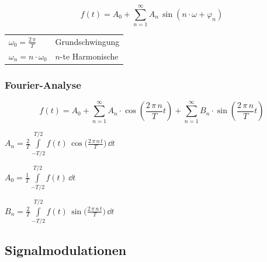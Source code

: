 \begin{minipage}[c]{0.48\columnwidth}
    $$ \boxed{ f(t) = A_0 + \sum\limits_{n=1}^{\infty}  A_n \, \sin(n \cdot \omega + \varphi_n) } $$
\end{minipage}
\hfill
\begin{minipage}[c]{0.48\columnwidth}
    \renewcommand{\arraystretch}{1.3}
    \begin{tabular}{ll}
        $\omega_0 = \frac{2 \, \pi}{T}$     & Grundschwingung   \\
        $\omega_n = n \cdot \omega_0$       & $n$-te Harmonische
    \end{tabular}
    \renewcommand{\arraystretch}{1}
\end{minipage}





\subsubsection{Fourier-Analyse}

\vspace{-0.2cm}

$$ \boxed{ f(t) = A_0 +  \sum\limits_{n=1}^{\infty}  A_n \cdot \cos  \left(\frac{ 2 \, \pi \, n}{T} t \right) + \sum\limits_{n=1}^{\infty}  B_n \cdot \sin \left( \frac{ 2 \, \pi \, n}{T} t \right)  } $$


\begin{minipage}{0.48\columnwidth}
    \centering
    $ A_n = \frac{2}{T} \int\limits_{-T/2}^{T/2} f(t) \, \cos \Big(\frac{ 2 \, \pi \, n \, t}{T}  \Big)  \, \dd t $
\end{minipage}
\hfill
\begin{minipage}{0.48\columnwidth}
    \centering
    $A_0 = \frac{1}{T} \int\limits_{-T/2}^{T/2} f(t) \, \dd t $
\end{minipage}

\medskip

\begin{minipage}{0.48\columnwidth}
    \centering
    $ B_n = \frac{2}{T} \int\limits_{-T/2}^{T/2} f(t) \, \sin \Big(\frac{ 2 \, \pi \, n \, t}{T}  \Big)  \, \dd t $
\end{minipage}
\hfill\null%



\subsection{Signalmodulationen}

